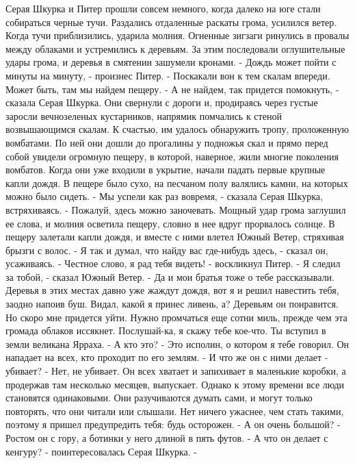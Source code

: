     Серая Шкурка и Питер прошли совсем немного, когда далеко на юге 
стали собираться черные тучи. Раздались отдаленные раскаты грома, 
усилился ветер. Когда тучи приблизились, ударила молния. Огненные 
зигзаги ринулись в провалы между облаками и устремились к деревьям. За 
этим последовали оглушительные удары грома, и деревья в смятении 
зашумели кронами.
    - Дождь может пойти с минуты на минуту, - произнес Питер. - 
Поскакали вон к тем скалам впереди. Может быть, там мы найдем пещеру.
    - А не найдем, так придется помокнуть, - сказала Серая Шкурка.
    Они свернули с дороги и, продираясь через густые заросли 
вечнозеленых кустарников, напрямик помчались к стеной возвышающимся 
скалам. К счастью, им удалось обнаружить тропу, проложенную вомбатами. 
По ней они дошли до прогалины у подножья скал и прямо перед собой 
увидели огромную пещеру, в которой, наверное, жили многие поколения 
вомбатов.
    Когда они уже входили в укрытие, начали падать первые крупные 
капли дождя. В пещере было сухо, на песчаном полу валялись камни, на 
которых можно было сидеть.
    - Мы успели как раз вовремя, - сказала Серая Шкурка, встряхиваясь. 
- Пожалуй, здесь можно заночевать.
    Мощный удар грома заглушил ее слова, и молния осветила пещеру, 
словно в нее вдруг прорвалось солнце. В пещеру залетали капли дождя, и 
вместе с ними влетел Южный Ветер, стряхивая брызги с волос.
    - Я так и думал, что найду вас где-нибудь здесь, - сказал он, 
усаживаясь.
    - Честное слово, я рад тебя видеть! - воскликнул Питер.
    - Я следил за тобой, - сказал Южный Ветер. - Да и мои братья тоже 
о тебе рассказывали. Деревья в этих местах давно уже жаждут дождя, вот 
я и решил навестить тебя, заодно напоив буш. Видал, какой я принес 
ливень, а? Деревьям он понравится. Но скоро мне придется уйти. Нужно 
промчаться еще сотни миль, прежде чем эта громада облаков иссякнет. 
Послушай-ка, я скажу тебе кое-что. Ты вступил в земли великана Ярраха.
    - А кто это?
    - Это исполин, о котором я тебе говорил. Он нападает на всех, кто 
проходит по его землям.
    - И что же он с ними делает - убивает?
    - Нет, не убивает. Он всех хватает и запихивает в маленькие 
коробки, а продержав там несколько месяцев, выпускает. Однако к этому 
времени все люди становятся одинаковыми. Они разучиваются думать сами, 
и могут только повторять, что они читали или слышали. Нет ничего 
ужаснее, чем стать такими, поэтому я пришел предупредить тебя: будь 
осторожен.
    - А он очень большой?
    - Ростом он с гору, а ботинки у него длиной в пять футов.
    - А что он делает с кенгуру? - поинтересовалась Серая Шкурка. - 
